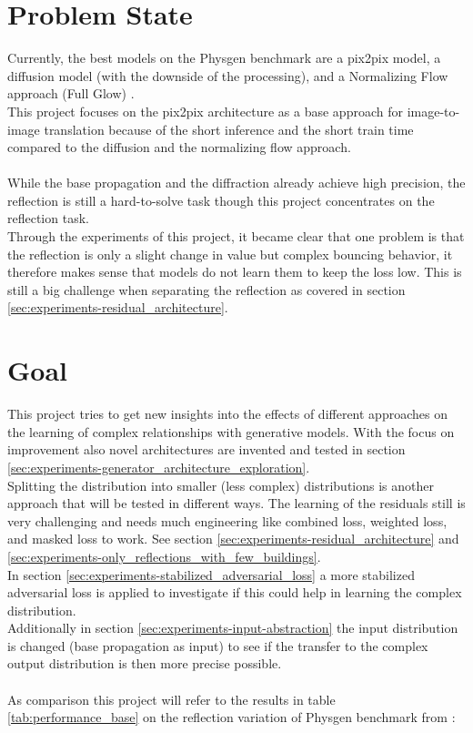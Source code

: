 	
	
	\section{Problem State}
	\label{sec:intro-problem}
		Currently, the best models on the Physgen benchmark are a pix2pix model, a diffusion model (with the downside of the processing), and a Normalizing Flow approach (Full Glow) \cite{martin_spitznagel_physicsgen_2025}\cite{achim_eckerle_evaluierung_2025}.\\
		This project focuses on the pix2pix architecture as a base approach for image-to-image translation because of the short inference and the short train time compared to the diffusion and the normalizing flow approach.\\
		\\
		While the base propagation and the diffraction already achieve high precision, the reflection is still a hard-to-solve task though this project concentrates on the reflection task. \\
		Through the experiments of this project, it became clear that one problem is that the reflection is only a slight change in value but complex bouncing behavior, it therefore makes sense that models do not learn them to keep the loss low. This is still a big challenge when separating the reflection as covered in section \ref{sec:experiments-residual_architecture}.
		
		
		
	\section{Goal}
	\label{sec:intro-goal}
		This project tries to get new insights into the effects of different approaches on the learning of complex relationships with generative models. With the focus on improvement also novel architectures are invented and tested in section \ref{sec:experiments-generator_architecture_exploration}.\\
		Splitting the distribution into smaller (less complex) distributions is another approach that will be tested in different ways. The learning of the residuals still is very challenging and needs much engineering like combined loss, weighted loss, and masked loss to work. See section \ref{sec:experiments-residual_architecture} and \ref{sec:experiments-only_reflections_with_few_buildings}.\\
		In section \ref{sec:experiments-stabilized_adversarial_loss} a more stabilized adversarial loss is applied to investigate if this could help in learning the complex distribution.\\
		Additionally in section \ref{sec:experiments-input-abstraction} the input distribution is changed (base propagation as input) to see if the transfer to the complex output distribution is then more precise possible.
		\\
		\\
		As comparison this project will refer to the results in table \ref{tab:performance_base} on the reflection variation of Physgen benchmark from \cite{martin_spitznagel_physicsgen_2025}\cite{achim_eckerle_evaluierung_2025}:
		

